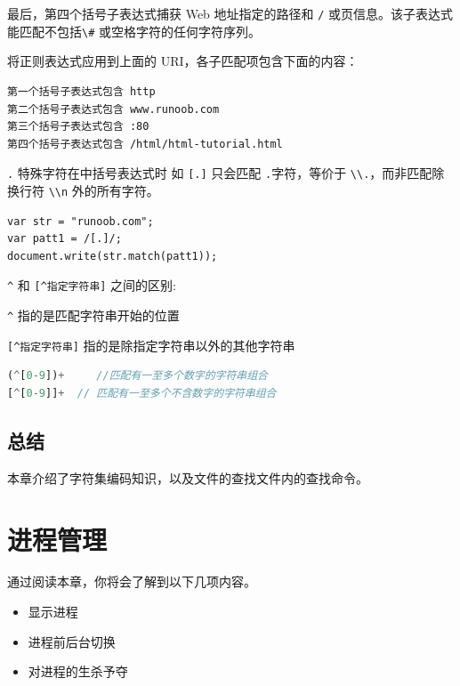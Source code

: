 \documentclass[doctor,openright,twoside]{sjtuthesis}
\providecommand{\tightlist}{%
    \setlength{\itemsep}{0pt}\setlength{\parskip}{0pt}}
\newcommand{\passthrough}[1]{#1}
\theoremstyle{plain}
\theoremstyle{definition}
\theoremstyle{remark}
\theoremstyle{ocrenumbox}
\theoremstyle{plain}
\begin{document}
最后，第四个括号子表达式捕获 Web 地址指定的路径和 \passthrough{\lstinline!/!} 或页信息。该子表达式能匹配不包括\passthrough{\lstinline!\#!} 或空格字符的任何字符序列。

将正则表达式应用到上面的 URI，各子匹配项包含下面的内容：

\begin{lstlisting}
第一个括号子表达式包含 http
第二个括号子表达式包含 www.runoob.com
第三个括号子表达式包含 :80
第四个括号子表达式包含 /html/html-tutorial.html
\end{lstlisting}

\passthrough{\lstinline!.!} 特殊字符在中括号表达式时 如 \passthrough{\lstinline![.]!} 只会匹配 \passthrough{\lstinline!.!}字符，等价于 \passthrough{\lstinline!\\.!}，而非匹配除换行符 \passthrough{\lstinline!\\n!} 外的所有字符。

\begin{lstlisting}
var str = "runoob.com";
var patt1 = /[.]/;
document.write(str.match(patt1));
\end{lstlisting}

\passthrough{\lstinline!^!} 和 \passthrough{\lstinline![^指定字符串]!} 之间的区别:

\passthrough{\lstinline!^!} 指的是匹配字符串开始的位置

\passthrough{\lstinline![^指定字符串]!} 指的是除指定字符串以外的其他字符串

\begin{lstlisting}[language=PHP]
(^[0-9])+     //匹配有一至多个数字的字符串组合
[^[0-9]]+  // 匹配有一至多个不含数字的字符串组合
\end{lstlisting}

\hypertarget{section-92}{%
\section{总结}\label{section-92}}

本章介绍了字符集编码知识，以及文件的查找文件内的查找命令。

\hypertarget{chap:manager-process}{%
\chapter{进程管理}\label{chap:manager-process}}

通过阅读本章，你将会了解到以下几项内容。

\begin{itemize}
\tightlist
\item
  显示进程
\item
  进程前后台切换
\item
  对进程的生杀予夺
\end{itemize}
\end{document}
